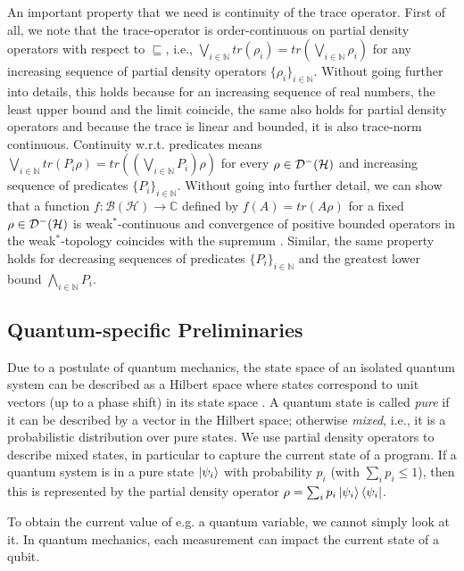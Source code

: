 \documentclass[a4paper,UKenglish,cleveref, autoref, thm-restate]{lipics-v2021}
\begin{document}
An important property that we need is continuity of the trace operator. First of all, we note that the trace-operator is order-continuous on partial density operators with respect to $\sqsubseteq$, i.e., $\bigvee_{i \in \mathbb{N}} tr(\rho_i) = tr( \bigvee_{i \in \mathbb{N}} \rho_i)$ for any increasing sequence of partial density operators $\{\rho_i\}_{i \in \mathbb{N}}$. Without going further into details, this holds because for an increasing sequence of real numbers, the least upper bound and the limit coincide, the same also holds for partial density operators \cite{heisenbergdualityUnruh} and because the trace is linear and bounded, it is also trace-norm continuous.
Continuity w.r.t. predicates means $\bigvee_{i \in \mathbb{N}} tr(P_i \rho) = tr((\bigvee_{i \in \mathbb{N}} P_i) \rho)$ for every $\rho \in \mathcal{D}^- (\mathcal{H})$ and increasing sequence of predicates $\{P_i\}_{i \in \mathbb{N}}$. Without going into further detail, we can show that a function $f: \mathcal{B}(\mathcal{H}) \to \mathbb{C}$ defined by $f(A)=tr(A\rho)$ for a fixed $\rho \in \mathcal{D}^- (\mathcal{H})$ is weak$^*$-continuous and convergence of positive bounded operators in the weak$^*$-topology coincides with the supremum \cite{heisenbergdualityUnruh}. Similar, the same property holds for decreasing sequences of predicates $\{P_i\}_{i \in \mathbb{N}}$ and the greatest lower bound $\bigwedge_{i \in \mathbb{N}} P_i$.

\subsection{Quantum-specific Preliminaries}
Due to a postulate of quantum mechanics, the state space of an isolated quantum system can be described as a Hilbert space where states correspond to unit vectors (up to a phase shift) in its state space \cite{floydHoareLogic}. A quantum state is called \textit{pure} if it can be described by a vector in the Hilbert space; otherwise \textit{mixed}, i.e., it is a probabilistic distribution over pure states.
We use partial density operators to describe mixed states, in particular to capture the current state of a program.
If a quantum system is in a pure state $\ket{\psi_i}$ with probability $p_i$ (with $\sum_i p_i \leq 1$), then this is represented by the partial density operator $\rho=\sum_i p_i \ket{\psi_i}\bra{\psi_i}$.

To obtain the current value of e.g. a quantum variable, we cannot simply look at it. In quantum mechanics, each measurement can impact the current state of a qubit.
\end{document}
